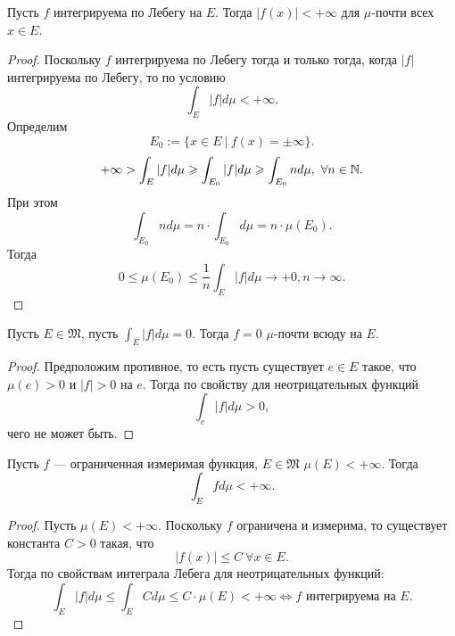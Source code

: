 \begin{statement}
    Пусть $f$ интегрируема по Лебегу на $E$.
    Тогда $|f(x)| < +\infty$ для $\mu$-почти всех $x \in E$.
\end{statement} 
\begin{proof}
    Поскольку $f$ интегрируема по Лебегу тогда и только тогда, когда $|f|$ интегрируема по Лебегу, то по условию
    \[\int_E |f| d\mu < +\infty.\]
    Определим
    \[E_0 := \{x \in E \ | \ f(x) = \pm \infty\}.\]
    \[+\infty > \int_E |f|d\mu \geqslant \int_{E_0} |f| d\mu \geqslant \int_{E_0} n d\mu, \ \forall n \in \mathbb{N}.\]
    При этом
    \[\int_{E_0} n d\mu = n \cdot \int_{E_0} d\mu = n \cdot \mu(E_0).\]
    Тогда
    \[0 \leqslant \mu(E_0) \leqslant \frac{1}{n} \int_E |f| d\mu \to +0, n \to \infty.\]
\end{proof} 

\begin{statement}
    Пусть $E \in \mathfrak{M}$, пусть $\int_E |f| d\mu = 0$.
    Тогда $f = 0$ $\mu$-почти всюду на $E$.
\end{statement} 
\begin{proof}
    Предположим противное, то есть пусть существует $e \in E$ такое, что $\mu(e) > 0$ и $|f| > 0$ на $e$.
    Тогда по свойству для неотрицательных функций
    \[\int_e |f| d\mu > 0,\]
    чего не может быть.
\end{proof} 

\begin{statement}
    Пусть $f$ — ограниченная измеримая функция, $E \in \mathfrak{M}$ $\mu(E) < +\infty$.
    Тогда 
    \[\int_E f d\mu < +\infty.\]
\end{statement} 
\begin{proof}
    Пусть $\mu(E) < +\infty$.
    Поскольку $f$ ограничена и измерима, то существует константа $C > 0$ такая, что
    \[|f(x)| \leqslant C \ \forall x \in E.\]
    Тогда по свойствам интеграла Лебега для неотрицательных функций:
    \[\int_E |f| d\mu \leqslant \int_E C d\mu \leqslant C \cdot \mu(E) < +\infty \Longleftrightarrow f \text{ интегрируема на } E.\]
\end{proof} 

